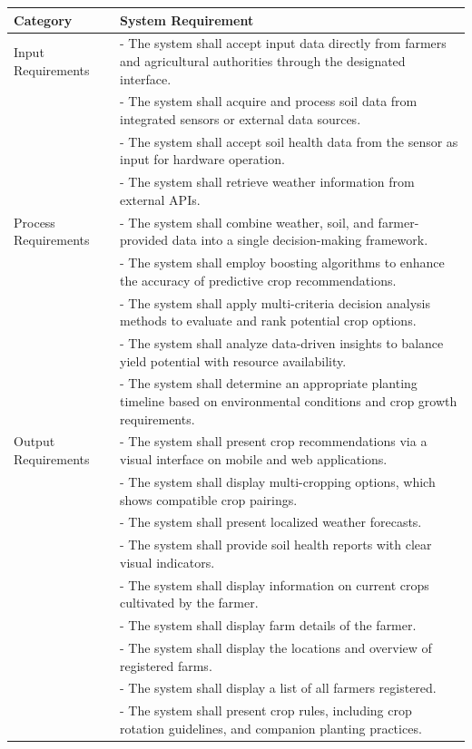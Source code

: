 {\begin{longtable}{p{4cm} p{9cm}}
		\toprule
		\textbf{Category} & \textbf{System Requirement} \\
		\midrule
		\endhead
		
		\bottomrule
		\endfoot
		
		Input Requirements & - The system shall accept input data directly from farmers and agricultural authorities through the designated interface. \\
		& - The system shall acquire and process soil data from integrated sensors or external data sources. \\
		& - The system shall accept soil health data from the sensor as input for hardware operation. \\
		& - The system shall retrieve weather information from external APIs. \\
		\midrule
		
		Process Requirements & - The system shall combine weather, soil, and farmer-provided data into a single decision-making framework. \\
		& - The system shall employ boosting algorithms to enhance the accuracy of predictive crop recommendations. \\
		& - The system shall apply multi-criteria decision analysis methods to evaluate and rank potential crop options. \\
		& - The system shall analyze data-driven insights to balance yield potential with resource availability. \\
		& - The system shall determine an appropriate planting timeline based on environmental conditions and crop growth requirements. \\
		\midrule
		
		Output Requirements & - The system shall present crop recommendations via a visual interface on mobile and web applications. \\
		& - The system shall display multi-cropping options, which shows compatible crop pairings. \\
		& - The system shall present localized weather forecasts. \\
		& - The system shall provide soil health reports with clear visual indicators. \\
		& - The system shall display information on current crops cultivated by the farmer. \\
		& - The system shall display farm details of the farmer. \\
		& - The system shall display the locations and overview of registered farms. \\
		& - The system shall display a list of all farmers registered. \\
		& - The system shall present crop rules, including crop rotation guidelines, and companion planting practices. \\
		\midrule
		

\end{longtable}}
